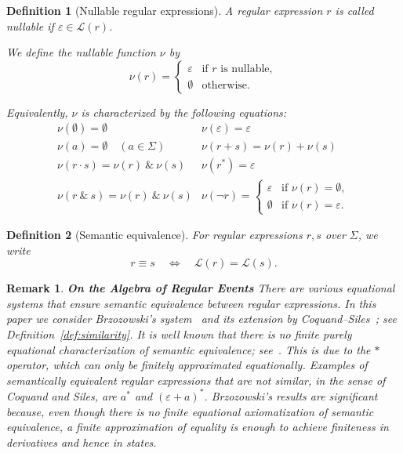\documentclass{article}
\newtheorem{definition}{Definition}[section]
\newtheorem{remark}{Remark}[section]
\begin{document}
\begin{definition}[Nullable regular expressions]\label{def:nullable}
A regular expression $r$ is called \emph{nullable} if
$\varepsilon \in \mathcal{L}(r)$.

We define the \emph{nullable} function $\nu$ by
\[
\nu(r) =
\begin{cases}
  \varepsilon & \text{if $r$ is nullable},\\
  \emptyset   & \text{otherwise}.
\end{cases}
\]

Equivalently, $\nu$ is characterized by the following equations:
\[
\begin{array}{ll}
     \nu(\emptyset)=\emptyset &
     \nu(\varepsilon)=\varepsilon  \\[1ex]
     \nu(a)=\emptyset \quad (a \in \Sigma)&
     \nu(r+s) = \nu(r) + \nu(s) \\[1ex]
     \nu(r\cdot s)=\nu(r)\: \& \: \nu(s) &
     \nu(r^*) = \varepsilon \\[1ex]
     \nu(r\:\&\:s) = \nu(r) \: \& \: \nu(s) &
     \nu(\neg r)= 
     \begin{cases}
         \varepsilon & \text{if } \nu(r) = \emptyset, \\
         \emptyset   & \text{if } \nu(r) = \varepsilon.
     \end{cases}
\end{array}
\]
\end{definition}

\begin{definition}[Semantic equivalence]\label{def:semantic-equivalence}
For regular expressions $r,s$ over $\Sigma$, we write
\[
  r \equiv s \quad\Longleftrightarrow\quad \mathcal{L}(r)=\mathcal{L}(s).
\]
\end{definition}

 \begin{remark}{\bf On the Algebra of Regular Events}
There are various equational systems that ensure semantic equivalence between regular expressions. In this paper we consider Brzozowski's system~\cite{B62} and its extension by Coquand--Siles~\cite{CoquandRegexEquality}; see Definition~\ref{def:similarity}. It is well known that there is no finite purely equational characterization of semantic equivalence; see~\cite{Salomaa,Kozen}. This is due to the $\ast$ operator, which can only be finitely approximated equationally. Examples of semantically equivalent regular expressions that are not similar, in the sense of Coquand and Siles, are $a^\ast$ and $(\varepsilon+a)^\ast$. Brzozowski's results are significant because, even though there is no finite equational axiomatization of semantic equivalence, a finite approximation of equality is enough to achieve finiteness in derivatives and hence in states.
\end{remark}
\end{document}

